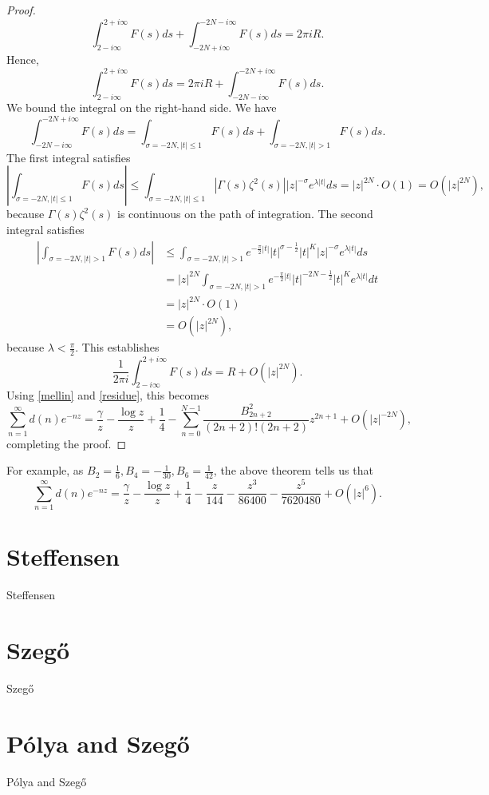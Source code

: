 \documentclass{article}
\begin{document}
\begin{proof}
\[
\int_{2-i\infty}^{2+i\infty} F(s) ds +\int_{-2N+i\infty}^{-2N-i\infty} F(s) ds
=2\pi i R.
\]
Hence,
\[
\int_{2-i\infty}^{2+i\infty} F(s) ds = 2\pi i R + \int_{-2N-i\infty}^{-2N+i\infty} F(s) ds.
\]
We bound the integral on the right-hand side. We have
\[
 \int_{-2N-i\infty}^{-2N+i\infty} F(s) ds = 
  \int_{\sigma=-2N, |t| \leq 1} F(s) ds+
    \int_{\sigma=-2N, |t| > 1} F(s)ds.
\]
The first integral satisfies
\[
\left|   \int_{\sigma=-2N, |t| \leq 1} F(s) ds \right|
\leq  \int_{\sigma=-2N, |t| \leq 1} |\Gamma(s) \zeta^2(s)|  |z|^{-\sigma} e^{\lambda |t|}
ds
= |z|^{2N} \cdot O(1) = O(|z|^{2N}),
\]
because $\Gamma(s) \zeta^2(s)$ is continuous on the path of integration.
The second integral satisfies
\begin{align*}
\left| \int_{\sigma=-2N, |t|>1} F(s) ds \right| &
\leq
 \int_{\sigma=-2N, |t|>1}
e^{-\frac{\pi}{2} |t|} |t|^{\sigma-\frac{1}{2}} |t|^K |z|^{-\sigma} e^{\lambda |t|}  ds\\
&=|z|^{2N}  \int_{\sigma=-2N, |t|>1} e^{-\frac{\pi}{2} |t|} |t|^{-2N-\frac{1}{2}} |t|^K  e^{\lambda |t|}  dt\\
&=|z|^{2N} \cdot O(1)\\
&=O(|z|^{2N}),
\end{align*}
because $\lambda<\frac{\pi}{2}$. This establishes
\[
\frac{1}{2\pi i} \int_{2-i\infty}^{2+i\infty} F(s) ds = R +O(|z|^{2N}).
\]
Using \eqref{mellin} and \eqref{residue}, this becomes
\[
\sum_{n=1}^\infty d(n) e^{-nz} = 
\frac{\gamma}{z}-\frac{\log z}{z}+\frac{1}{4} - \sum_{n=0}^{N-1}  \frac{B_{2n+2}^2}{(2n+2)!(2n+2)} z^{2n+1}
+O(|z|^{-2N}),
\]
completing the proof.
\end{proof}

For example,
as $B_2=\frac{1}{6},B_4=-\frac{1}{30},B_6=\frac{1}{42}$, the above theorem tells us that
\[
\sum_{n=1}^\infty d(n)e^{-nz} =  \frac{\gamma}{z}-\frac{\log z}{z}+\frac{1}{4}
-\frac{z}{144}
-\frac{z^3}{86400}
-\frac{z^5}{7620480}+
O(|z|^6).
\]


\section{Steffensen}
Steffensen \cite{steffensen}



\section{Szeg{\H o}}
Szeg{\H o} \cite{szego}


\section{P\'olya and Szeg{\H o}}
P\'olya and Szeg{\H o} \cite{polya}
\end{document}
